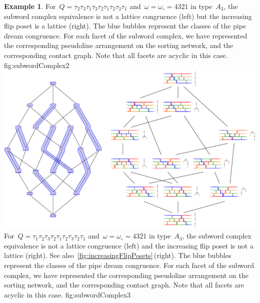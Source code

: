 \documentclass[reqno]{amsart}
\theoremstyle{definition}
\newtheorem{example}[theorem]{Example}
\newcommand{\wo}{\omega_\circ} %
\begin{document}
\begin{example}
{For~$Q = \tau_2 \tau_3 \tau_1 \tau_3 \tau_2 \tau_1 \tau_2 \tau_3 \tau_1$ and~$\omega = \wo = 4321$ in type~$A_3$, the subword complex equivalence is not a lattice congruence (left) but the increasing flip poset is a lattice (right). The blue bubbles represent the classes of the pipe dream congruence. For each facet of the subword complex, we have represented the corresponding pseudoline arrangement on the sorting network, and the corresponding contact graph. Note that all facets are acyclic in this case.}
{fig:subwordComplex2}
%
{\includegraphics[scale=.65]{subwordComplex3}}
{For~$Q = \tau_1 \tau_2 \tau_3 \tau_2 \tau_1 \tau_2 \tau_3 \tau_2 \tau_1$ and~$\omega = \wo = 4321$ in type~$A_3$, the subword complex equivalence is not a lattice congruence (left) and the increasing flip poset is not a lattice (right). See also~\cref{fig:increasingFlipPosets}\,(right). The blue bubbles represent the classes of the pipe dream congruence. For each facet of the subword complex, we have represented the corresponding pseudoline arrangement on the sorting network, and the corresponding contact graph. Note that all facets are acyclic in this case.}
{fig:subwordComplex3}
\end{example}
\end{document}
